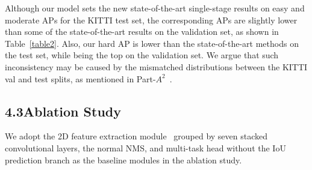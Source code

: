 \documentclass[letterpaper]{article}
\begin{document}
Although our model sets the new state-of-the-art single-stage results on easy and moderate APs for the KITTI test set, the corresponding APs are slightly lower than some of the state-of-the-art results on the validation set, as shown in Table~\ref{table2}.
Also, our hard AP is lower than the state-of-the-art methods on the test set, while being the top on the validation set.
We argue that such inconsistency may be caused by the mismatched distributions between the KITTI val and test splits, as mentioned in Part-$A^2$~\cite{shi2020points}.




\subsection{4.3\quad Ablation Study}


We adopt the 2D feature extraction module~\cite{yan2018second} grouped by seven stacked convolutional layers, the normal NMS, and multi-task head without the IoU prediction branch as the baseline modules in the ablation study.
\end{document}
